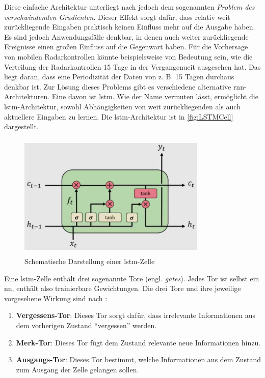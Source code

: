 Diese einfache Architektur unterliegt nach \cite[S. 260]{DeepLearningPythonKeras} jedoch dem sogenannten \emph{Problem des verschwindenden Gradienten}.
Dieser Effekt sorgt dafür, dass relativ weit zurückliegende Eingaben praktisch keinen Einfluss mehr auf die Ausgabe haben.
Es sind jedoch Anwendungsfälle denkbar, in denen auch weiter zurückliegende Ereignisse einen großen Einfluss auf die Gegenwart haben.
Für die Vorhersage von mobilen Radarkontrollen könnte beispielsweise von Bedeutung sein, wie die Verteilung der Radarkontrollen 15 Tage in der Vergangenueit ausgesehen hat.
Das liegt daran, dass eine Periodizität der Daten von z. B. 15 Tagen durchaus denkbar ist.
Zur Lösung dieses Problems gibt es verschiedene alternative \acrshort{rnn}-Architekturen.
Eine davon ist \acrfull{lstm}.
Wie der Name vermuten lässt, ermöglicht die \acrshort{lstm}-Architektur, sowohl Abhängigkeiten von weit zurückliegenden als auch aktuellere Eingaben zu lernen.
Die \acrshort{lstm}-Architektur ist in \autoref{fig:LSTMCell} dargestellt.

\begin{figure}[h]
    \centering
    \includegraphics[width=0.8\textwidth,height=6cm,keepaspectratio=true]{content/images/LSTMCell.png}
    \caption{Schematische Darstellung einer \acrshort{lstm}-Zelle \cite{6S191RNN}}
    \label{fig:LSTMCell}
\end{figure}

Eine \acrshort{lstm}-Zelle enthält drei sogenannte Tore (engl. \emph{gates}).
Jedes Tor ist selbst ein \acrshort{nn}, enthält also trainierbare Gewichtungen.
Die drei Tore und ihre jeweilige vorgesehene Wirkung sind nach \cite{6S191RNN}:

\begin{minipage}{\linewidth}
\begin{enumerate}
    \setlength\itemsep{0.2em}
    \item \textbf{Vergessens-Tor}: Dieses Tor sorgt dafür, dass irrelevante Informationen aus dem vorherigen Zustand "`vergessen"' werden.
    \item \textbf{Merk-Tor}: Dieses Tor fügt dem Zustand relevante neue Informationen hinzu.
    \item \textbf{Ausgangs-Tor}: Dieses Tor bestimmt, welche Informationen aus dem Zustand zum Ausgang der Zelle gelangen sollen.
\end{enumerate}
\end{minipage}

